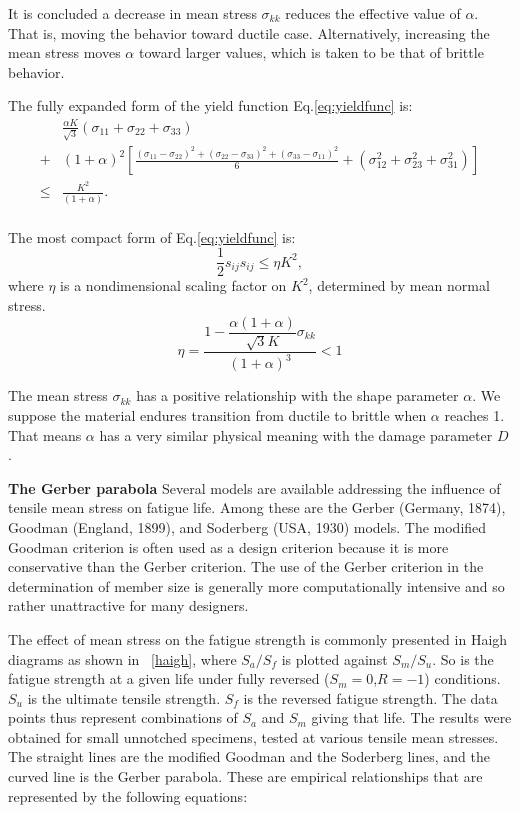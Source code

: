 \documentclass[3p,times,procedia,number]{elsarticle}
\newcommand{\figref}[1]{\figurename~\ref{#1}}
\begin{document}
It is concluded a decrease in mean stress $\sigma_{kk}$ reduces the effective value of $\alpha$. That is, moving the behavior toward ductile case. Alternatively, increasing the mean stress moves $\alpha$ toward larger values, which is taken to be that of brittle behavior.

The fully expanded form of the yield function Eq.\eqref{eq:yieldfunc} is:
\begin{equation}
	\begin{split}
		&\frac{\alpha K}{\sqrt{3}}(\sigma_{11}+\sigma_{22}+\sigma_{33})\\
		+&(1+\alpha)^2\left[\frac{(\sigma_{11}-\sigma_{22})^2+(\sigma_{22}-\sigma_{33})^2+(\sigma_{33}-\sigma_{11})^2}{6}
		+(\sigma_{12}^2+\sigma_{23}^2+\sigma_{31}^2) \right]\\
		\leqslant&\frac{K^2}{(1+\alpha)}.\\
	\end{split}
\end{equation}

The most compact form of Eq.\eqref{eq:yieldfunc} is:
\begin{equation}
	\frac{1}{2}s_{ij}s_{ij}\leqslant\eta K^2,
\end{equation}
where $\eta$ is a nondimensional scaling factor on $K^2$, determined by mean normal stress.
$$\eta=\frac{1-\dfrac{\alpha(1+\alpha)}{\sqrt{3}K}\sigma_{kk}}{(1+\alpha)^3}<1$$


The mean stress $\sigma_{kk}$ has a positive relationship with the shape parameter $\alpha$. We suppose the material endures transition from ductile to brittle when $\alpha$ reaches 1. That means $\alpha$ has a very similar physical meaning with the damage parameter $D$.

\textbf{The Gerber parabola}
Several models are available
addressing the influence of tensile mean stress on fatigue life. Among these are the Gerber (Germany, 1874), Goodman
(England, 1899), and Soderberg (USA, 1930) models.  The modified Goodman criterion is often used as a design criterion
because it is more conservative than the Gerber criterion. The use of the Gerber criterion in the determination of member size is generally more computationally  intensive and so rather unattractive for many designers.

The effect of mean stress on the fatigue strength is commonly presented in Haigh diagrams as shown in \figref{haigh}, where $S_a / S_f$ is plotted against $S_m / S_u$. So is the fatigue strength at a given life under fully reversed ($S_m = 0$,$R = -1$) conditions. $S_u$ is the ultimate tensile strength. $S_f$ is the reversed fatigue strength. The data points thus represent combinations of $S_a$ and $S_m$ giving that life. The results were obtained for small unnotched specimens, tested at various tensile mean stresses. The straight lines are the modified Goodman and the Soderberg lines, and the curved line is the Gerber parabola. These are empirical relationships that are represented by the following equations:
\end{document}
